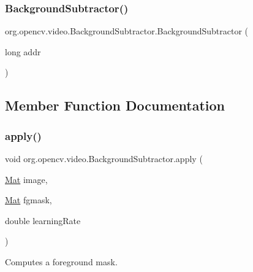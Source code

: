 \subsubsection{\texorpdfstring{Background\+Subtractor()}{BackgroundSubtractor()}}
{\footnotesize\ttfamily org.\+opencv.\+video.\+Background\+Subtractor.\+Background\+Subtractor (\begin{DoxyParamCaption}\item[{long}]{addr }\end{DoxyParamCaption})\hspace{0.3cm}{\ttfamily [protected]}}



\subsection{Member Function Documentation}
\mbox{\label{classorg_1_1opencv_1_1video_1_1_background_subtractor_a290ed6795a4c1e74474c3046fc888c62}} 
\subsubsection{\texorpdfstring{apply()}{apply()}\hspace{0.1cm}{\footnotesize\ttfamily [1/2]}}
{\footnotesize\ttfamily void org.\+opencv.\+video.\+Background\+Subtractor.\+apply (\begin{DoxyParamCaption}\item[{\mbox{\hyperlink{classorg_1_1opencv_1_1core_1_1_mat}{Mat}}}]{image,  }\item[{\mbox{\hyperlink{classorg_1_1opencv_1_1core_1_1_mat}{Mat}}}]{fgmask,  }\item[{double}]{learning\+Rate }\end{DoxyParamCaption})}

Computes a foreground mask.


